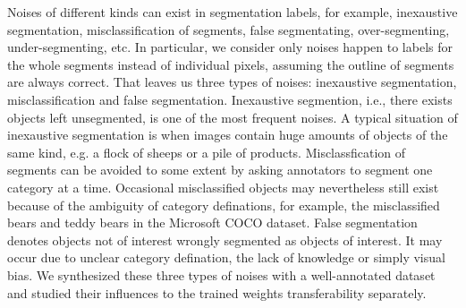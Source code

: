 

Noises of different kinds can exist in segmentation labels, for example, inexaustive segmentation, misclassification of segments, false segmentating, over-segmenting, under-segmenting, etc.
In particular, we consider only noises happen to labels for the whole segments instead of individual pixels, assuming the outline of segments are always correct.
That leaves us three types of noises: inexaustive segmentation, misclassification and false segmentation.
Inexaustive segmention, i.e., there exists objects left unsegmented, is one of the most frequent noises.
A typical situation of inexaustive segmentation is when images contain huge amounts of objects of the same kind, e.g. a flock of sheeps or a pile of products.
Misclassfication of segments can be avoided to some extent by asking annotators to segment one category at a time.\cite{lin2014microsoft}
Occasional misclassified objects may nevertheless still exist because of the ambiguity of category definations, for example, the misclassified bears and teddy bears in the Microsoft COCO dataset.
False segmentation denotes objects not of interest wrongly segmented as objects of interest.
It may occur due to unclear category defination, the lack of knowledge or simply visual bias.
We synthesized these three types of noises with a well-annotated dataset and studied their influences to the trained weights transferability separately.




